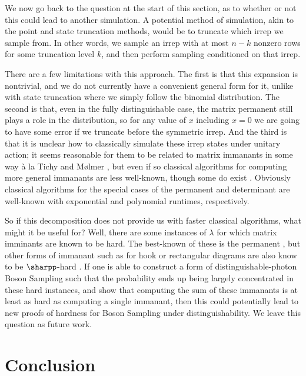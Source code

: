 We now go back to the question at the start of this section, as to whether or not this could lead to another simulation. A potential method of simulation, akin to the point and state truncation methods, would be to truncate which irrep we sample from. In other words, we sample an irrep with at most $n-k$ nonzero rows for some truncation level $k$, and then perform sampling conditioned on that irrep.

There are a few limitations with this approach. The first is that this expansion is nontrivial, and we do not currently have a convenient general form for it, unlike with state truncation where we simply follow the binomial distribution. The second is that, even in the fully distinguishable case, the matrix permanent still plays a role in the distribution, so for any value of $x$ including $x=0$ we are going to have some error if we truncate before the symmetric irrep. And the third is that it is unclear how to classically simulate these irrep states under unitary action; it seems reasonable for them to be related to matrix immanants in some way \`{a} la Tichy and M\o lmer \cite{tichy2017}, but even if so classical algorithms for computing more general immanants are less well-known, though some do exist \cite{hartmann1985, barvinok1990, burgisser2000, mertens2013}. Obviously classical algorithms for the special cases of the permanent and determinant are well-known with exponential \cite{glynn2010} and polynomial \cite{fisikopoulos2016} runtimes, respectively.

So if this decomposition does not provide us with faster classical algorithms, what might it be useful for? Well, there are some instances of $\lambda$ for which matrix imminants are known to be hard. The best-known of these is the permanent \cite{valiant1979, aaronson2011}, but other forms of immanant such as for hook or rectangular diagrams are also know to be $\sharpp$-hard \cite{burgisser2000immanants}. If one is able to construct a form of distinguishable-photon Boson Sampling such that the probability ends up being largely concentrated in these hard instances, and show that computing the sum of these immanants is at least as hard as computing a single immanant, then this could potentially lead to new proofs of hardness for Boson Sampling under distinguishability. We leave this question as future work.

\section{Conclusion}
\label{sec:conclusion}

